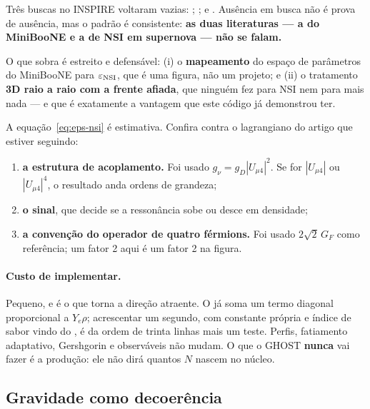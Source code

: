 \begin{nota}
Três buscas no INSPIRE voltaram vazias: ; ; e . Ausência em busca não é prova de ausência, mas o padrão é
consistente: \textbf{as duas literaturas --- a do MiniBooNE e a de NSI em
supernova --- não se falam.}

\medskip
O que sobra é estreito e defensável: (i) o \textbf{mapeamento} do espaço de
parâmetros do MiniBooNE para $\varepsilon_{\rm NSI}$, que é uma figura, não um
projeto; e (ii) o tratamento \textbf{3D raio a raio com a frente afiada}, que
ninguém fez para NSI nem para mais nada --- e que é exatamente a vantagem que
este código já demonstrou ter.
\end{nota}

\begin{alerta}
A equação~\eqref{eq:eps-nsi} é estimativa. Confira contra o lagrangiano do
artigo que estiver seguindo:
\begin{enumerate}
\item \textbf{a estrutura de acoplamento.} Foi usado
  $g_\nu = g_D|U_{\mu4}|^2$. Se for $|U_{\mu4}|$ ou $|U_{\mu4}|^4$, o resultado
  anda ordens de grandeza;
\item \textbf{o sinal}, que decide se a ressonância sobe ou desce em densidade;
\item \textbf{a convenção do operador de quatro férmions.} Foi usado
  $2\sqrt2\,G_F$ como referência; um fator 2 aqui é um fator 2 na figura.
\end{enumerate}
\end{alerta}

\paragraph{Custo de implementar.} Pequeno, e é o que torna a direção
atraente. O  já soma um termo diagonal proporcional
a $Y_e\rho$; acrescentar um segundo, com constante própria e índice de sabor
vindo do , é da ordem de trinta linhas mais um teste. Perfis,
fatiamento adaptativo, Gershgorin e observáveis não mudam. O que o GHOST
\textbf{nunca} vai fazer é a produção: ele não dirá quantos $N$ nascem no
núcleo.

\subsection{Gravidade como decoerência}

